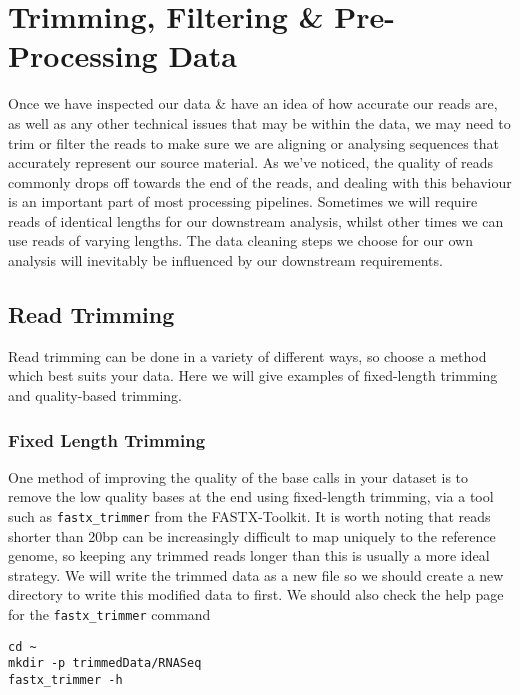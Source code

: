 \chapter{Trimming, Filtering \& Pre-Processing Data}


Once we have inspected our data \& have an idea of how accurate our reads are, as well as any other technical issues that may be within the data, we may need to trim or filter the reads to make sure we are aligning or analysing sequences that accurately represent our source material.
As we've noticed, the quality of reads commonly drops off towards the end of the reads, and dealing with this behaviour is an important part of most processing pipelines.
Sometimes we will require reads of identical lengths for our downstream analysis, whilst other times we can use reads of varying lengths.
The data cleaning steps we choose for our own analysis will inevitably be influenced by our downstream requirements.

\section{Read Trimming}
Read trimming can be done in a variety of different ways, so choose a method which best suits your data. 
Here we will give examples of fixed-length trimming and quality-based trimming.

\subsection{Fixed Length Trimming}
One method of improving the quality of the base calls in your dataset is to remove the low quality bases at the end using fixed-length trimming, via a tool such as \texttt{fastx_trimmer} from the FASTX-Toolkit.
It is worth noting that reads shorter than 20bp can be increasingly difficult to map uniquely to the reference genome, so keeping any trimmed reads longer than this is usually a more ideal strategy.
We will write the trimmed data as a new file so we should create a new directory to write this modified data to first.
We should also check the help page for the \texttt{fastx_trimmer} command
\begin{steps}
\begin{lstlisting}
cd ~
mkdir -p trimmedData/RNASeq
fastx_trimmer -h
\end{lstlisting}
\end{steps}

